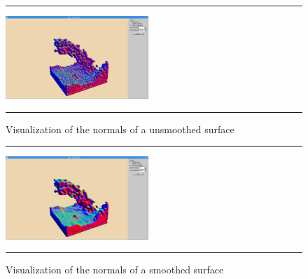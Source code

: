 \begin{figure}[!th]
\hrule
\begin{center}
\vspace*{2ex}\includegraphics[width=0.48\textwidth,clip=true,trim=10cm 1cm 10cm 3cm]{pictures/normal_normal.png}
\end{center}
\caption{Visualization of the normals of a unsmoothed surface}
\label{fig:normals} 
\vspace*{2ex}
\hrule
\end{figure}

\begin{figure}[!th]
\hrule
\begin{center}
\vspace*{2ex}\includegraphics[width=0.48\textwidth,clip=true,trim=10cm 1cm 10cm 3cm]{pictures/normals_smoothed.png}
\end{center}
\caption{Visualization of the normals of a smoothed surface}
\label{fig:normals2} 
\vspace*{2ex}
\hrule
\end{figure}